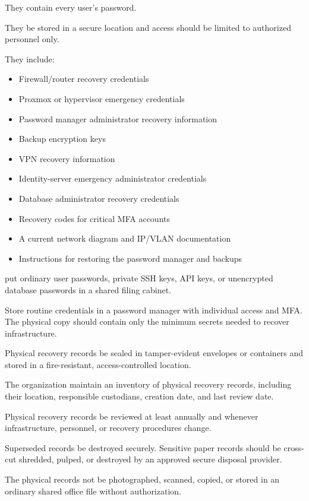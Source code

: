 They \shouldnot{} contain every user's password.

They \should{} be stored in a secure location and access should be limited to authorized personnel only.

They \should{} include:
\begin{itemize}
    \item Firewall/router recovery credentials
    \item Proxmox or hypervisor emergency credentials
    \item Password manager administrator recovery information
    \item Backup encryption keys
    \item VPN recovery information
    \item Identity-server emergency administrator credentials
    \item Database administrator recovery credentials
    \item Recovery codes for critical MFA accounts
    \item A current network diagram and IP/VLAN documentation
    \item Instructions for restoring the password manager and backups
\end{itemize}

\donot{} put ordinary user passwords, private SSH keys, API keys, or unencrypted database passwords in a shared filing cabinet.

Store routine credentials in a password manager with individual access and MFA. The physical copy should contain only the minimum secrets needed to recover infrastructure.

Physical recovery records \should{} be sealed in tamper-evident envelopes or containers and stored in a fire-resistant, access-controlled location.

The organization \must{} maintain an inventory of physical recovery records, including their location, responsible custodians, creation date, and last review date.

Physical recovery records \must{} be reviewed at least annually and whenever infrastructure, personnel, or recovery procedures change.

Superseded records \must{} be destroyed securely. Sensitive paper records should be cross-cut shredded, pulped, or destroyed by an approved secure disposal provider.

The physical records \must{} not be photographed, scanned, copied, or stored in an ordinary shared office file without authorization.

